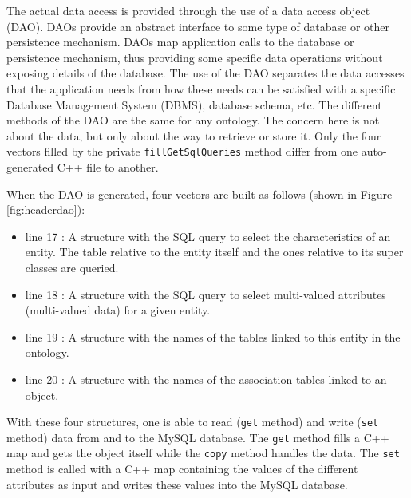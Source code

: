 The actual data access is provided through the use of a data access object (DAO).
DAOs provide an abstract interface to some type of database or other persistence
mechanism. DAOs map application calls to the database or persistence mechanism, 
thus providing some specific data operations without exposing
details of the database. The use of the DAO separates the data accesses that the application needs from how these needs can be satisfied with a specific
Database Management System (DBMS), database schema, etc. 
The different methods of the DAO are the same for any ontology. 
The concern here is not about the data, but only about the way to retrieve or store it. Only the four vectors filled by the
private \texttt{fillGetSqlQueries} method differ from one 
auto-generated C++ file to another.

When the DAO is generated, four vectors are built as follows (shown in Figure \ref{fig:headerdao}):

\begin{itemize}
\item line \textcolor{BrickRed}{17} : A structure with the SQL query to select the characteristics of an entity. The table
relative to the entity itself and the ones relative to its super classes are queried.
\item line \textcolor{BrickRed}{18} : A structure with the SQL query to select multi-valued attributes (multi-valued data) for a given entity.
\item line \textcolor{BrickRed}{19} : A structure with the names of the tables linked to this entity in the ontology.
\item line \textcolor{BrickRed}{20} : A structure with the names of the association tables linked to an object.
\end{itemize}

With these four structures, one is able to read (\texttt{get} method) and write (\texttt{set} method) data from and to the MySQL database. The \texttt{get} method fills 
a C++ map and gets the object itself while the \texttt{copy} method handles the data. The \texttt{set} method is called with a C++ map containing the values of the 
different attributes as input and writes these values into the MySQL database.



